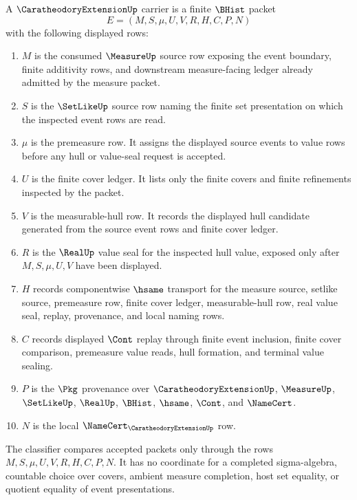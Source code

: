 \begin{definition}
\label{def:caratheodory-extension-finite-premeasure-carrier}
A $\CaratheodoryExtensionUp$ carrier is a finite $\BHist$ packet
$$
E=(M,S,\mu,U,V,R,H,C,P,N)
$$
with the following displayed rows:
\begin{enumerate}
\item $M$ is the consumed $\MeasureUp$ source row exposing the event boundary, finite additivity rows, and downstream measure-facing ledger already admitted by the measure packet.
\item $S$ is the $\SetLikeUp$ source row naming the finite set presentation on which the inspected event rows are read.
\item $\mu$ is the premeasure row. It assigns the displayed source events to value rows before any hull or value-seal request is accepted.
\item $U$ is the finite cover ledger. It lists only the finite covers and finite refinements inspected by the packet.
\item $V$ is the measurable-hull row. It records the displayed hull candidate generated from the source event rows and finite cover ledger.
\item $R$ is the $\RealUp$ value seal for the inspected hull value, exposed only after $M,S,\mu,U,V$ have been displayed.
\item $H$ records componentwise $\hsame$ transport for the measure source, setlike source, premeasure row, finite cover ledger, measurable-hull row, real value seal, replay, provenance, and local naming rows.
\item $C$ records displayed $\Cont$ replay through finite event inclusion, finite cover comparison, premeasure value reads, hull formation, and terminal value sealing.
\item $P$ is the $\Pkg$ provenance over $\CaratheodoryExtensionUp$, $\MeasureUp$, $\SetLikeUp$, $\RealUp$, $\BHist$, $\hsame$, $\Cont$, and $\NameCert$.
\item $N$ is the local $\NameCert_{\CaratheodoryExtensionUp}$ row.
\end{enumerate}
The classifier compares accepted packets only through the rows $M,S,\mu,U,V,R,H,C,P,N$. It has no coordinate for a completed sigma-algebra, countable choice over covers, ambient measure completion, host set equality, or quotient equality of event presentations.
\end{definition}

